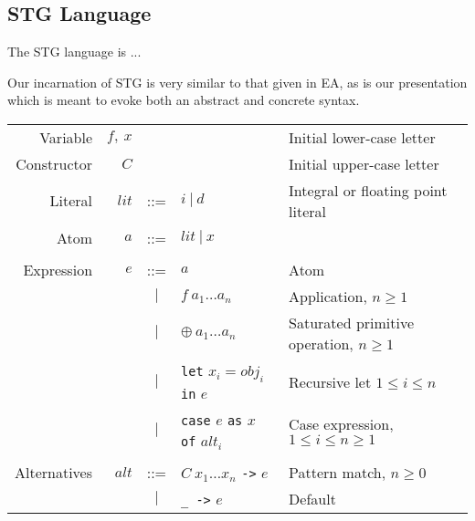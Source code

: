 \documentclass{llncs}
\begin{document}
\subsection{STG Language}
\setlength{\tabcolsep}{5pt}

The STG language is ...

Our incarnation of STG is very similar to that given in EA, as is
our presentation which is meant to evoke both an abstract and concrete syntax.

\begin{table}
\footnotesize %
\centering
\begin{tabular}{r r c l l}

Variable     & $f,\ x$        &     &                                              & Initial lower-case letter \\
Constructor  & $C$            &     &                                              & Initial upper-case letter \\
Literal      & $\mathit{lit}$ & ::= & $i\ |\ d$                                    & Integral or floating point literal \\
Atom         & $a$            & ::= & $\mathit{lit}\ |\ x$                         & \\ %
\\
Expression   & $e$            & ::= & $a$                                          & Atom \\
             &                & $|$ & $f\ a_1\dots a_n$                            & Application, $n\ge 1$ \\
             &                & $|$ & $\oplus\ a_1\dots a_n$                       & Saturated primitive operation, $n\ge 1$ \\
             &                & $|$ & \texttt{let} $x_i = \mathit{obj}_i$ 
                                         \texttt{in} $e$                           & Recursive let $1\le i \le n$\\
             &                & $|$ & \texttt{case} $e$ \texttt{as} 
                                        $x$ \texttt{of} $\mathit{alt}_i$           & Case expression, $1\le i \le n \ge 1$\\
\\
Alternatives & $\mathit{alt}$ & ::= & $C\ x_1\dots x_n$ \texttt{->} $e$            & Pattern match, $n \ge 0$ \\
             &                & $|$ & \texttt{\_ ->} $e$                           & Default \\

\end{tabular}
\end{table}
\end{document}
